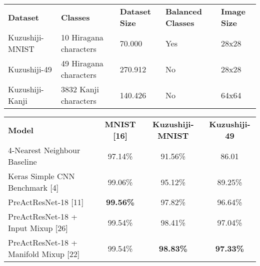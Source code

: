 \begin{table*}[h]
	\begin{tabular}{lllll}
		\rowcolor[HTML]{EFEFEF}
		\textbf{Dataset} & \textbf{Classes}       & \textbf{Dataset Size} & \textbf{Balanced Classes} & \textbf{Image Size} \\
		Kuzushiji-MNIST  & 10 Hiragana characters & 70.000                & Yes                       & 28x28               \\
		Kuzushiji-49     & 49 Hiragana characters & 270.912               & No                        & 28x28               \\
		Kuzushiji-Kanji  & 3832 Kanji characters  & 140.426               & No                        & 64x64
	\end{tabular}
	\label{tab:kuzushiji-struct}
\end{table*}

\begin{table*}[h]
	\begin{tabular}{lccc}
		\rowcolor[HTML]{EFEFEF}
		\textbf{Model}                            & \textbf{MNIST {[}16{]}} & \textbf{Kuzushiji-MNIST} & \textbf{Kuzushiji-49} \\
		4-Nearest Neighbour Baseline              & 97.14\%                 & 91.56\%                  & 86.01                 \\
		Keras Simple CNN Benchmark {[}4{]}        & 99.06\%                 & 95.12\%                  & 89.25\%               \\
		PreActResNet-18 {[}11{]}                  & \textbf{99.56\%}        & 97.82\%                  & 96.64\%               \\
		PreActResNet-18 + Input Mixup {[}26{]}    & 99.54\%                 & 98.41\%                  & 97.04\%               \\
		PreActResNet-18 + Manifold Mixup {[}22{]} & 99.54\%                 & \textbf{98.83\%}         & \textbf{97.33\%}
	\end{tabular}
	\label{tab:kuzushiji-benchmarks}
\end{table*}